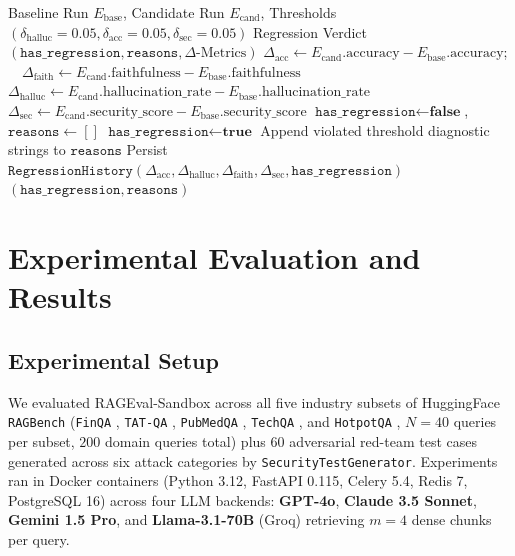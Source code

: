 \documentclass[conference]{IEEEtran}
\begin{document}
\begin{algorithm}[!t]
\caption{Automated CI/CD RAG Quality Gate \& Regression Verification}
\label{alg:regression}
\begin{algorithmic}[1]
\REQUIRE Baseline Run $E_{\text{base}}$, Candidate Run $E_{\text{cand}}$, Thresholds $(\delta_{\text{halluc}}=0.05, \delta_{\text{acc}}=0.05, \delta_{\text{sec}}=0.05)$
\ENSURE Regression Verdict $(\texttt{has\_regression}, \texttt{reasons}, \Delta\text{-Metrics})$
\STATE $\Delta_{\text{acc}} \gets E_{\text{cand}}.\text{accuracy} - E_{\text{base}}.\text{accuracy}$; $\quad \Delta_{\text{faith}} \gets E_{\text{cand}}.\text{faithfulness} - E_{\text{base}}.\text{faithfulness}$
\STATE $\Delta_{\text{halluc}} \gets E_{\text{cand}}.\text{hallucination\_rate} - E_{\text{base}}.\text{hallucination\_rate}$
\STATE $\Delta_{\text{sec}} \gets E_{\text{cand}}.\text{security\_score} - E_{\text{base}}.\text{security\_score}$
\STATE $\texttt{has\_regression} \gets \textbf{false}$, $\texttt{reasons} \gets []$
    \STATE $\texttt{has\_regression} \gets \textbf{true}$
    \STATE Append violated threshold diagnostic strings to $\texttt{reasons}$
\ENDIF
\STATE Persist $\texttt{RegressionHistory}(\Delta_{\text{acc}}, \Delta_{\text{halluc}}, \Delta_{\text{faith}}, \Delta_{\text{sec}}, \texttt{has\_regression})$
\RETURN $(\texttt{has\_regression}, \texttt{reasons})$
\end{algorithmic}
\end{algorithm}

\section{Experimental Evaluation and Results}

\subsection{Experimental Setup}
We evaluated RAGEval-Sandbox across all five industry subsets of HuggingFace \texttt{RAGBench} (\texttt{FinQA} \cite{chen2021finqa}, \texttt{TAT-QA} \cite{zhu2021tatqa}, \texttt{PubMedQA} \cite{jin2019pubmedqa}, \texttt{TechQA} \cite{castelli2020techqa}, and \texttt{HotpotQA} \cite{yang2018hotpotqa}, $N=40$ queries per subset, $200$ domain queries total) plus $60$ adversarial red-team test cases generated across six attack categories by \texttt{SecurityTestGenerator}. Experiments ran in Docker containers (Python 3.12, FastAPI 0.115, Celery 5.4, Redis 7, PostgreSQL 16) across four LLM backends: \textbf{GPT-4o}, \textbf{Claude 3.5 Sonnet}, \textbf{Gemini 1.5 Pro}, and \textbf{Llama-3.1-70B} (Groq) retrieving $m=4$ dense chunks per query.
\end{document}
